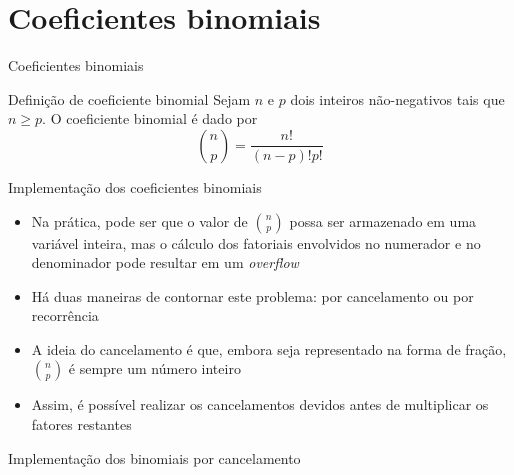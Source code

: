 \section{Coeficientes binomiais}

\begin{frame}[fragile]{Coeficientes binomiais}

    \begin{block}{Definição de coeficiente binomial}
        Sejam  $n$ e $p$ dois inteiros não-negativos tais que $n\geq p$. O coeficiente binomial é
        dado por
        $$
            \binom{n}{p} = \frac{n!}{(n - p)!p!}
        $$
    \end{block}

\end{frame}

\begin{frame}[fragile]{Implementação dos coeficientes binomiais}

    \begin{itemize}
        \item Na prática, pode ser que o valor de $\binom{n}{p}$ possa ser armazenado em uma
        variável inteira, mas o cálculo dos fatoriais envolvidos no numerador e no denominador pode
        resultar em um \textit{overflow}

        \item Há duas maneiras de contornar este problema: por cancelamento ou por recorrência

        \item A ideia do cancelamento é que, embora seja representado na forma de fração,
            $\binom{n}{p}$ é sempre um número inteiro

        \item Assim, é possível realizar os cancelamentos devidos antes de multiplicar os fatores
            restantes
    \end{itemize}

\end{frame}

\begin{frame}[fragile]{Implementação dos binomiais por cancelamento}
\end{frame}

